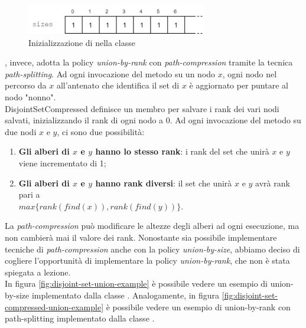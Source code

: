 \begin{figure}[htbp]
	\centering
    \includegraphics[width=0.7\textwidth]{./images/DisjointSetSizesVector.png}
	\caption{Inizializzazione di  nella classe }
	\label{fig:disjoint-set-sizes}
\end{figure}

\noindent {}, invece, adotta la policy \textit{union-by-rank} con \textit{path-compression} tramite la tecnica \textit{path-splitting}.
Ad ogni invocazione del metodo  su un nodo $x$, ogni nodo nel percorso da $x$ all'antenato che identifica il set di $x$ è aggiornato per puntare al nodo "nonno". \\
\noindent DisjointSetCompressed definisce un membro  per salvare i rank dei vari nodi salvati, inizializzando il rank di ogni nodo a 0. Ad ogni invocazione del metodo  su due nodi $x$ e $y$, ci sono due possibilità:

\begin{enumerate}
    \item \textbf{Gli alberi di $x$ e $y$ hanno lo stesso rank}: i rank del set che unirà $x$ e $y$ viene incrementato di 1;
    \item \textbf{Gli alberi di $x$ e $y$ hanno rank diversi}: il set che unirà $x$ e $y$ avrà rank pari a \\ $max\{ rank(find(x)), rank(find(y)) \}$.
\end{enumerate}

\noindent La \textit{path-compression} può modificare le altezze degli alberi ad ogni esecuzione, ma non cambierà mai il valore dei rank.
Nonostante sia possibile implementare tecniche di \textit{path-compression} anche con la policy \textit{union-by-size}, abbiamo deciso di cogliere l'opportunità di implementare la policy \textit{union-by-rank}, che non è stata spiegata a lezione. \\

\noindent In figura \ref{fig:disjoint-set-union-example} è possibile vedere un esempio di union-by-size implementato dalla classe . Analogamente, in figura \ref{fig:disjoint-set-compressed-union-example} è possibile vedere un esempio di union-by-rank con path-splitting implementato dalla classe .

